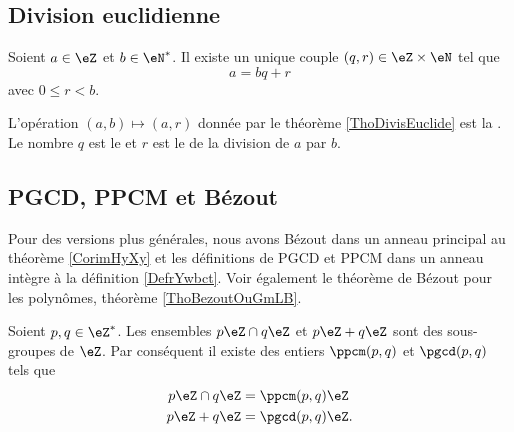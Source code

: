 \subsection{Division euclidienne}

\begin{theorem}     \label{ThoDivisEuclide}
    Soient \( a\in\eZ\) et \( b\in\eN^*\). Il existe un unique couple \( (q,r)\in\eZ\times\eN\) tel que
    \begin{equation}
        a=bq+r
    \end{equation}
    avec \( 0\leq r<b\).
\end{theorem}

L'opération \( (a,b)\mapsto(a,r)\) donnée par le théorème \ref{ThoDivisEuclide} est la . Le nombre \( q\) est le  et \( r\) est le  de la division de \( a\) par \( b\).



\subsection{PGCD, PPCM et Bézout}

Pour des versions plus générales, nous avons Bézout dans un anneau principal au théorème \ref{CorimHyXy} et les définitions de PGCD et PPCM dans un anneau intègre à la définition \ref{DefrYwbct}. Voir également le théorème de Bézout pour les polynômes, théorème \ref{ThoBezoutOuGmLB}.

Soient \( p,q\in\eZ^*\). Les ensembles \( p\eZ\cap q\eZ\) et \( p\eZ+q\eZ\) sont des sous-groupes de \( \eZ\). Par conséquent il existe des entiers \( \ppcm(p,q)\) et \( \pgcd(p,q)\) tels que
\begin{subequations}
    \begin{align}
        p\eZ\cap q\eZ&=\ppcm(p,q)\eZ\\
        p\eZ + q\eZ&=\pgcd(p,q)\eZ.
    \end{align}
\end{subequations}

